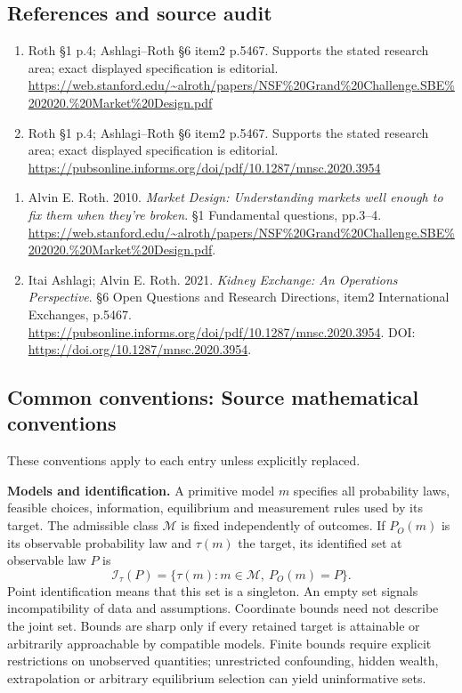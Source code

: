 \documentclass[11pt,a4paper]{article}
\begin{document}
\subsection*{References and source audit}
\begin{enumerate}
\item Roth §1 p.4; Ashlagi–Roth §6 item2 p.5467. Supports the stated research area; exact displayed specification is editorial. \url{https://web.stanford.edu/~alroth/papers/NSF%20Grand%20Challenge.SBE%202020.%20Market%20Design.pdf}
\item Roth §1 p.4; Ashlagi–Roth §6 item2 p.5467. Supports the stated research area; exact displayed specification is editorial. \url{https://pubsonline.informs.org/doi/pdf/10.1287/mnsc.2020.3954}
\end{enumerate}
\begin{enumerate}\raggedright
\item\hypertarget{definitions:source:30007580:1}{} Alvin E. Roth. 2010. \emph{Market Design: Understanding markets well enough to fix them when they’re broken}. §1 Fundamental questions, pp.3–4.
\url{https://web.stanford.edu/~alroth/papers/NSF%20Grand%20Challenge.SBE%202020.%20Market%20Design.pdf}.
\item\hypertarget{definitions:source:30007580:2}{} Itai Ashlagi; Alvin E. Roth. 2021. \emph{Kidney Exchange: An Operations Perspective}. §6 Open Questions and Research Directions, item2 International Exchanges, p.5467.
\url{https://pubsonline.informs.org/doi/pdf/10.1287/mnsc.2020.3954}.
DOI: \url{https://doi.org/10.1287/mnsc.2020.3954}.
\end{enumerate}

\subsection*{Common conventions: Source mathematical conventions}

These conventions apply to each entry unless explicitly replaced.

\textbf{Models and identification.} A primitive model \(m\) specifies all probability laws, feasible choices, information, equilibrium and measurement rules used by its target. The admissible class \(\mathcal M\) is fixed independently of outcomes. If \(P_O(m)\) is its observable probability law and \(\tau(m)\) the target, its identified set at observable law \(P\) is
\[
 \mathcal I_\tau(P)=\{\tau(m):m\in\mathcal M,\ P_O(m)=P\}.
\]
Point identification means that this set is a singleton. An empty set signals incompatibility of data and assumptions. Coordinate bounds need not describe the joint set. Bounds are sharp only if every retained target is attainable or arbitrarily approachable by compatible models. Finite bounds require explicit restrictions on unobserved quantities; unrestricted confounding, hidden wealth, extrapolation or arbitrary equilibrium selection can yield uninformative sets.
\end{document}
